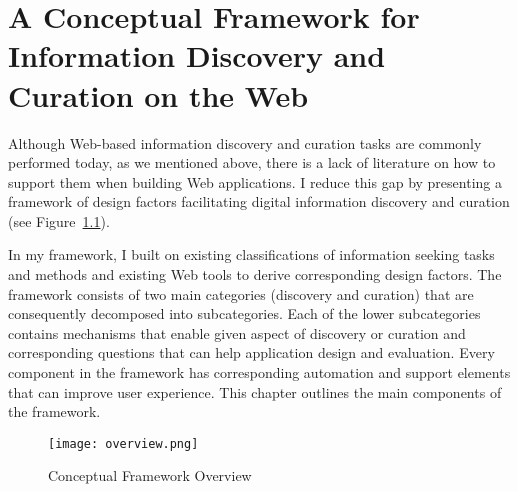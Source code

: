 \chapter{A Conceptual Framework for Information Discovery and Curation on the Web}
\label{chapter:framework}

Although Web-based information discovery and curation tasks are commonly performed today, as we mentioned above, there is a lack of literature on how to support them when building Web applications. I reduce this gap by presenting a framework of design factors facilitating digital information discovery and curation (see Figure~\ref{fig:overview}). 

In my framework, I built on existing classifications of information seeking tasks and methods and existing Web tools to derive corresponding design factors. The framework consists of two main categories (discovery and curation) that are consequently decomposed into subcategories. Each of the lower subcategories contains mechanisms that enable given aspect of discovery or curation and corresponding questions that can help application design and evaluation. Every component in the framework has corresponding automation and support elements that can improve user experience. This chapter outlines the main components of the framework. 


\begin{figure}[ht!]
	\noindent
	\centering
	\texttt{[image: overview.png]}
	\caption{Conceptual Framework Overview}
	\label{fig:overview} 
\end{figure}



